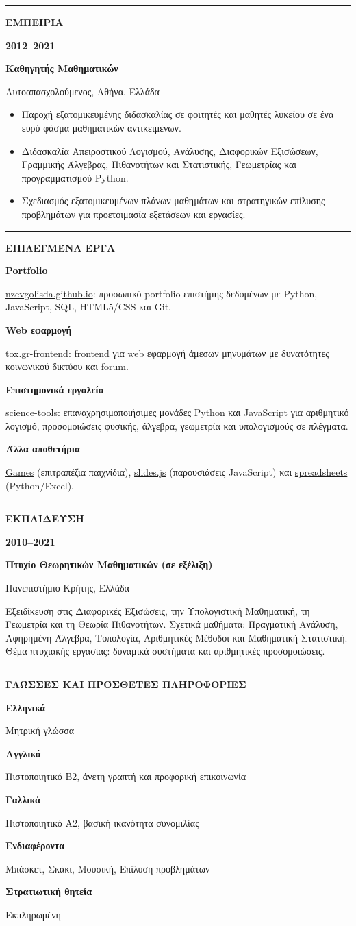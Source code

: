 \documentclass[10pt,a4paper]{article}
\newcommand{\sectiontitle}[1]{%
    \vspace{0.28em}%
    {\color{accent}\rule{0.08\textwidth}{1.4pt}}\hspace{0.55em}%
    {\small\bfseries\color{ink}\MakeUppercase{#1}}\par
    \vspace{0.12em}
}
\newcommand{\cvrow}[2]{%
    {\small\bfseries\color{accent}#1}\par
    {\small\color{ink}#2}\par\vspace{0.03em}
}
\newcommand{\entry}[4]{%
    {\small\bfseries\color{accent}#1}\par
    {\bfseries\color{ink}#2}\par
    {\small\color{muted}#3, #4}\par\vspace{0.03em}
}
\begin{document}
\sectiontitle{Εμπειρία}
\entry{2012--2021}{Καθηγητής Μαθηματικών}{Αυτοαπασχολούμενος}{Αθήνα, Ελλάδα}
\begin{itemize}
    \item Παροχή εξατομικευμένης διδασκαλίας σε φοιτητές και μαθητές λυκείου σε ένα ευρύ φάσμα μαθηματικών αντικειμένων.
    \item Διδασκαλία Απειροστικού Λογισμού, Ανάλυσης, Διαφορικών Εξισώσεων, Γραμμικής Άλγεβρας, Πιθανοτήτων και Στατιστικής, Γεωμετρίας και προγραμματισμού Python.
    \item Σχεδιασμός εξατομικευμένων πλάνων μαθημάτων και στρατηγικών επίλυσης προβλημάτων για προετοιμασία εξετάσεων και εργασίες.
\end{itemize}

\sectiontitle{Επιλεγμένα Έργα}
\cvrow{Portfolio}{\href{https://nzevgolisda.github.io/}{nzevgolisda.github.io}: προσωπικό portfolio επιστήμης δεδομένων με Python, JavaScript, SQL, HTML5/CSS και Git.}
\cvrow{Web εφαρμογή}{\href{https://github.com/nzevgolisda/tox.gr-frontend}{tox.gr-frontend}: frontend για web εφαρμογή άμεσων μηνυμάτων με δυνατότητες κοινωνικού δικτύου και forum.}
\cvrow{Επιστημονικά εργαλεία}{\href{https://github.com/nzevgolisda/science-tools}{science-tools}: επαναχρησιμοποιήσιμες μονάδες Python και JavaScript για αριθμητικό λογισμό, προσομοιώσεις φυσικής, άλγεβρα, γεωμετρία και υπολογισμούς σε πλέγματα.}
\cvrow{Άλλα αποθετήρια}{\href{https://github.com/nzevgolisda/Games}{Games} (επιτραπέζια παιχνίδια), \href{https://github.com/nzevgolisda/slides.js}{slides.js} (παρουσιάσεις JavaScript) και \href{https://github.com/nzevgolisda/spreadsheets}{spreadsheets} (Python/Excel).}

\sectiontitle{Εκπαίδευση}
\entry{2010--2021}{Πτυχίο Θεωρητικών Μαθηματικών (σε εξέλιξη)}{Πανεπιστήμιο Κρήτης}{Ελλάδα}
Εξειδίκευση στις Διαφορικές Εξισώσεις, την Υπολογιστική Μαθηματική, τη Γεωμετρία και τη Θεωρία Πιθανοτήτων. Σχετικά μαθήματα: Πραγματική Ανάλυση, Αφηρημένη Άλγεβρα, Τοπολογία, Αριθμητικές Μέθοδοι και Μαθηματική Στατιστική. Θέμα πτυχιακής εργασίας: δυναμικά συστήματα και αριθμητικές προσομοιώσεις.

\sectiontitle{Γλώσσες και Πρόσθετες Πληροφορίες}
\cvrow{Ελληνικά}{Μητρική γλώσσα}
\cvrow{Αγγλικά}{Πιστοποιητικό B2, άνετη γραπτή και προφορική επικοινωνία}
\cvrow{Γαλλικά}{Πιστοποιητικό A2, βασική ικανότητα συνομιλίας}
\cvrow{Ενδιαφέροντα}{Μπάσκετ, Σκάκι, Μουσική, Επίλυση προβλημάτων}\vspace{0.1em}
\cvrow{Στρατιωτική θητεία}{Εκπληρωμένη}
\end{document}
